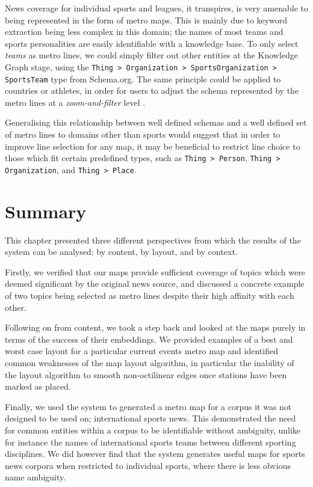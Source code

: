 News coverage for individual sports and leagues, it transpires, is very amenable to being represented in the form of metro maps. This is mainly due to keyword extraction being less complex in this domain; the names of most teams and sports personalities are easily identifiable with a knowledge base. To only select \textit{teams} as metro lines, we could simply filter out other entities at the Knowledge Graph stage, using the \texttt{Thing > Organization > SportsOrganization > SportsTeam} type from Schema.org. The same principle could be applied to countries or athletes, in order for users to adjust the schema represented by the metro lines at a \textit{zoom-and-filter} level \citep{TheEyesHaveIt}.

Generalising this relationship between well defined schemas and a well defined set of metro lines to domains other than sports would suggest that in order to improve line selection for any map, it may be beneficial to restrict line choice to those which fit certain predefined types, such as \texttt{Thing > Person}, \texttt{Thing > Organization}, and \texttt{Thing > Place}. 

\section{Summary}

This chapter presented three different perspectives from which the results of the system can be analysed; by content, by layout, and by context. 

Firstly, we verified that our maps provide sufficient coverage of topics which were deemed significant by the original news source, and discussed a concrete example of two topics being selected as metro lines despite their high affinity with each other.

Following on from content, we took a step back and looked at the maps purely in terms of the success of their embeddings. We provided examples of a best and worst case layout for a particular current events metro map and identified common weaknesses of the map layout algorithm, in particular the inability of the layout algorithm to smooth non-octilinear edges once stations have been marked as placed.

Finally, we used the system to generated a metro map for a corpus it was not designed to be used on; international sports news. This demonstrated the need for common entities within a corpus to be identifiable without ambiguity, unlike for instance the names of international sports teams between different sporting disciplines. We did however find that the system generates useful maps for sports news corpora when restricted to individual sports, where there is less obvious name ambiguity.

